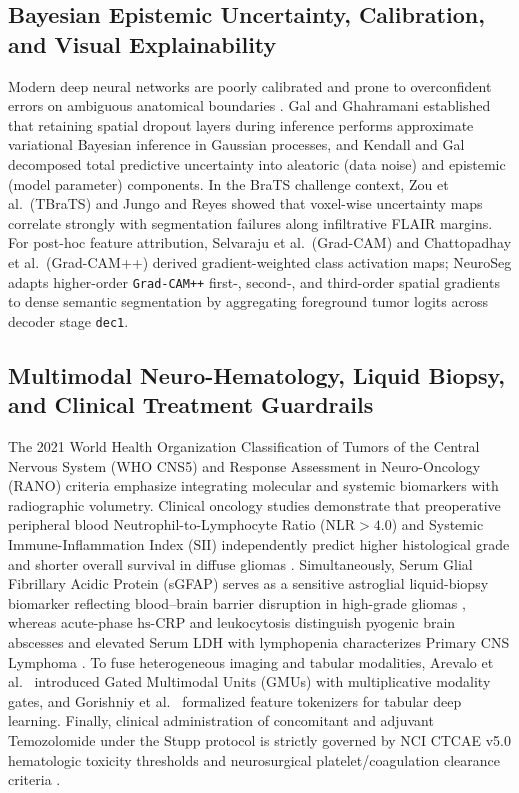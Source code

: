 \documentclass[journal,onecolumn,10pt]{IEEEtran}
\begin{document}
\subsection{Bayesian Epistemic Uncertainty, Calibration, and Visual Explainability}
Modern deep neural networks are poorly calibrated and prone to overconfident errors on ambiguous anatomical boundaries \cite{guo2017calibration}. Gal and Ghahramani \cite{gal2016dropout} established that retaining spatial dropout layers during inference performs approximate variational Bayesian inference in Gaussian processes, and Kendall and Gal \cite{kendall2017uncertainties} decomposed total predictive uncertainty into aleatoric (data noise) and epistemic (model parameter) components. In the BraTS challenge context, Zou et al.\ (TBraTS) \cite{zou2022tbrats} and Jungo and Reyes \cite{jungo2019uncertainty} showed that voxel-wise uncertainty maps correlate strongly with segmentation failures along infiltrative FLAIR margins. For post-hoc feature attribution, Selvaraju et al.\ (Grad-CAM) \cite{selvaraju2017gradcam} and Chattopadhay et al.\ (Grad-CAM++) \cite{chattopadhay2018gradcampp} derived gradient-weighted class activation maps; NeuroSeg adapts higher-order \texttt{Grad-CAM++} first-, second-, and third-order spatial gradients to dense semantic segmentation by aggregating foreground tumor logits across decoder stage \texttt{dec1}.

\subsection{Multimodal Neuro-Hematology, Liquid Biopsy, and Clinical Treatment Guardrails}
The 2021 World Health Organization Classification of Tumors of the Central Nervous System (WHO CNS5) \cite{louis2021who} and Response Assessment in Neuro-Oncology (RANO) criteria \cite{wen2010rano, eisenhauer2009recist} emphasize integrating molecular and systemic biomarkers with radiographic volumetry. Clinical oncology studies demonstrate that preoperative peripheral blood Neutrophil-to-Lymphocyte Ratio ($\text{NLR} > 4.0$) and Systemic Immune-Inflammation Index ($\text{SII}$) independently predict higher histological grade and shorter overall survival in diffuse gliomas \cite{bambury2013nlr, abdelrazeq2021sii}. Simultaneously, Serum Glial Fibrillary Acidic Protein (sGFAP) serves as a sensitive astroglial liquid-biopsy biomarker reflecting blood--brain barrier disruption in high-grade gliomas \cite{perez2021gfap}, whereas acute-phase $\text{hs-CRP}$ and leukocytosis distinguish pyogenic brain abscesses \cite{brouwer2014abscess} and elevated Serum LDH with lymphopenia characterizes Primary CNS Lymphoma \cite{grommes2017pcnsl}. To fuse heterogeneous imaging and tabular modalities, Arevalo et al.\ \cite{arevalo2017gmu} introduced Gated Multimodal Units (GMUs) with multiplicative modality gates, and Gorishniy et al.\ \cite{gorishniy2021fttransformer} formalized feature tokenizers for tabular deep learning. Finally, clinical administration of concomitant and adjuvant Temozolomide under the Stupp protocol \cite{stupp2005radiotherapy} is strictly governed by NCI CTCAE v5.0 hematologic toxicity thresholds \cite{ctcae2017v5} and neurosurgical platelet/coagulation clearance criteria \cite{lichaos2015platelet}.
\end{document}
